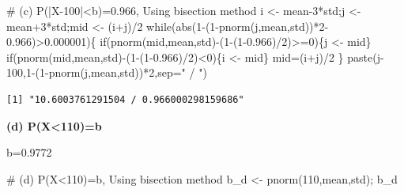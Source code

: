 \documentclass[
  letterpaper,
  DIV=11,
  numbers=noendperiod]{scrreprt}
\newenvironment{Shaded}{\begin{snugshade}}{\end{snugshade}}
\newcommand{\AttributeTok}[1]{\textcolor[rgb]{0.40,0.45,0.13}{#1}}
\newcommand{\CommentTok}[1]{\textcolor[rgb]{0.37,0.37,0.37}{#1}}
\newcommand{\ControlFlowTok}[1]{\textcolor[rgb]{0.00,0.23,0.31}{#1}}
\newcommand{\DecValTok}[1]{\textcolor[rgb]{0.68,0.00,0.00}{#1}}
\newcommand{\FloatTok}[1]{\textcolor[rgb]{0.68,0.00,0.00}{#1}}
\newcommand{\FunctionTok}[1]{\textcolor[rgb]{0.28,0.35,0.67}{#1}}
\newcommand{\NormalTok}[1]{\textcolor[rgb]{0.00,0.23,0.31}{#1}}
\newcommand{\OtherTok}[1]{\textcolor[rgb]{0.00,0.23,0.31}{#1}}
\newcommand{\SpecialCharTok}[1]{\textcolor[rgb]{0.37,0.37,0.37}{#1}}
\newcommand{\StringTok}[1]{\textcolor[rgb]{0.13,0.47,0.30}{#1}}
\begin{document}
\begin{Shaded}
\begin{Highlighting}[]
\CommentTok{\# (c) P(|X{-}100|\textless{}b)=0.966, Using bisection method}
\NormalTok{i }\OtherTok{\textless{}{-}}\NormalTok{ mean}\DecValTok{{-}3}\SpecialCharTok{*}\NormalTok{std;j }\OtherTok{\textless{}{-}}\NormalTok{ mean}\SpecialCharTok{+}\DecValTok{3}\SpecialCharTok{*}\NormalTok{std;mid }\OtherTok{\textless{}{-}}\NormalTok{ (i}\SpecialCharTok{+}\NormalTok{j)}\SpecialCharTok{/}\DecValTok{2}
\ControlFlowTok{while}\NormalTok{(}\FunctionTok{abs}\NormalTok{(}\DecValTok{1}\SpecialCharTok{{-}}\NormalTok{(}\DecValTok{1}\SpecialCharTok{{-}}\FunctionTok{pnorm}\NormalTok{(j,mean,std))}\SpecialCharTok{*}\DecValTok{2}\FloatTok{{-}0.966}\NormalTok{)}\SpecialCharTok{\textgreater{}}\FloatTok{0.000001}\NormalTok{)\{}
  \ControlFlowTok{if}\NormalTok{(}\FunctionTok{pnorm}\NormalTok{(mid,mean,std)}\SpecialCharTok{{-}}\NormalTok{(}\DecValTok{1}\SpecialCharTok{{-}}\NormalTok{(}\DecValTok{1}\FloatTok{{-}0.966}\NormalTok{)}\SpecialCharTok{/}\DecValTok{2}\NormalTok{)}\SpecialCharTok{\textgreater{}=}\DecValTok{0}\NormalTok{)\{j }\OtherTok{\textless{}{-}}\NormalTok{ mid\}}
  \ControlFlowTok{if}\NormalTok{(}\FunctionTok{pnorm}\NormalTok{(mid,mean,std)}\SpecialCharTok{{-}}\NormalTok{(}\DecValTok{1}\SpecialCharTok{{-}}\NormalTok{(}\DecValTok{1}\FloatTok{{-}0.966}\NormalTok{)}\SpecialCharTok{/}\DecValTok{2}\NormalTok{)}\SpecialCharTok{\textless{}}\DecValTok{0}\NormalTok{)\{i }\OtherTok{\textless{}{-}}\NormalTok{ mid\}}
\NormalTok{  mid}\OtherTok{=}\NormalTok{(i}\SpecialCharTok{+}\NormalTok{j)}\SpecialCharTok{/}\DecValTok{2}
\NormalTok{\}}
\FunctionTok{paste}\NormalTok{(j}\DecValTok{{-}100}\NormalTok{,}\DecValTok{1}\SpecialCharTok{{-}}\NormalTok{(}\DecValTok{1}\SpecialCharTok{{-}}\FunctionTok{pnorm}\NormalTok{(j,mean,std))}\SpecialCharTok{*}\DecValTok{2}\NormalTok{,}\AttributeTok{sep=}\StringTok{" / "}\NormalTok{)}
\end{Highlighting}
\end{Shaded}

\begin{verbatim}
[1] "10.6003761291504 / 0.966000298159686"
\end{verbatim}

\textbf{(d) P(X\textless110)=b}

b=0.9772

\begin{Shaded}
\begin{Highlighting}[]
\CommentTok{\# (d) P(X\textless{}110)=b, Using bisection method}
\NormalTok{b\_d }\OtherTok{\textless{}{-}} \FunctionTok{pnorm}\NormalTok{(}\DecValTok{110}\NormalTok{,mean,std); b\_d}
\end{Highlighting}
\end{Shaded}
\end{document}
